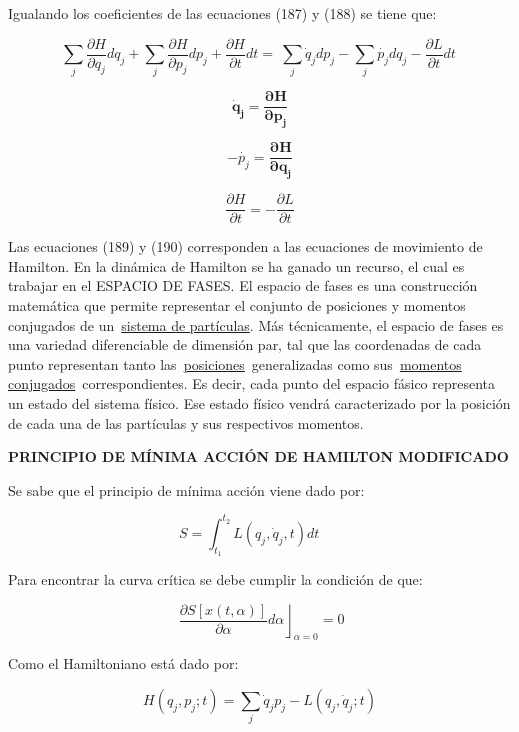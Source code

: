 \documentclass[]{article}
\begin{document}
Igualando los coeficientes de las ecuaciones (187) y (188) se tiene que:

\[\sum_{j}^{}{\frac{\partial H}{\partial q_{j}}dq_{j} +}\sum_{j}^{}{\frac{\partial H}{\partial p_{j}}dp_{j} +}\frac{\partial H}{\partial t}dt = \ \sum_{j}^{}{{\dot{q}}_{j}dp_{j} -}\sum_{j}^{}\dot{p_{j}}dq_{j} - \frac{\partial L}{\partial t}dt\ \]

\[{\dot{\mathbf{q}}}_{\mathbf{j}}\mathbf{=}\frac{\mathbf{\partial H}}{\mathbf{\partial}\mathbf{p}_{\mathbf{j}}}\]

\[\mathbf{-}\dot{p_{j}}\mathbf{=}\frac{\mathbf{\partial H}}{\mathbf{\partial}\mathbf{q}_{\mathbf{j}}}\]

\[\frac{\partial H}{\partial t} = - \frac{\partial L}{\partial t}\]

Las ecuaciones (189) y (190) corresponden a las ecuaciones de movimiento
de Hamilton. En la dinámica de Hamilton se ha ganado un recurso, el cual
es trabajar en el ESPACIO DE FASES. El espacio de fases es una
construcción matemática que permite representar el conjunto de
posiciones y momentos conjugados de
un~\href{https://es.wikipedia.org/wiki/Sistema_de_part\%C3\%ADculas_(f\%C3\%ADsica)}{sistema
de partículas}. Más técnicamente, el espacio de fases es una variedad
diferenciable de dimensión par, tal que las coordenadas de cada punto
representan tanto
las~\href{https://es.wikipedia.org/wiki/Posici\%C3\%B3n}{posiciones}~generalizadas
como sus~\href{https://es.wikipedia.org/wiki/Momento_conjugado}{momentos
conjugados}~correspondientes. Es decir, cada punto del espacio fásico
representa un estado del sistema físico. Ese estado físico vendrá
caracterizado por la posición de cada una de las partículas y sus
respectivos momentos.

\textbf{PRINCIPIO DE MÍNIMA ACCIÓN DE HAMILTON MODIFICADO}

Se sabe que el principio de mínima acción viene dado por:

\[S = \int_{t_{1}}^{t_{2}}{L\left( q_{j},{\dot{q}}_{j},t \right)dt}\ \ \ \ \ \ \ \]

Para encontrar la curva crítica se debe cumplir la condición de que:

\[\left. \ \frac{\partial S\left\lbrack x(t,\alpha) \right\rbrack}{\partial\alpha}d\alpha \right\rfloor_{\alpha = 0} = 0\]

Como el Hamiltoniano está dado por:

\[H\left( q_{j},p_{j};t \right) = \sum_{j}^{}{{\dot{q}}_{j}p_{j} - L\left( q_{j},{\dot{q}}_{j};t \right)}\]
\end{document}
